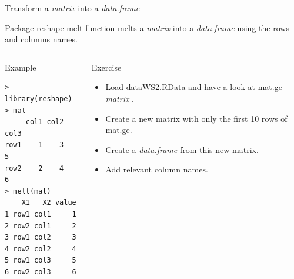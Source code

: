 \documentclass[10pt]{beamer}
\newcommand{\df}{{\it data.frame} }
\newcommand{\mat}{{\it matrix} }
\begin{document}
\begin{frame}[fragile]{Transform a \mat into a \df}
  \begin{block}{Package {\sf reshape}}
    {\sf melt} function melts a \mat into a \df using the rows and columns names.    
  \end{block}
  \begin{columns}
    \begin{column}{.5\textwidth}
      \begin{exampleblock}{Example}
\begin{verbatim}
> library(reshape)
> mat
     col1 col2 col3
row1    1    3    5
row2    2    4    6
> melt(mat)
    X1   X2 value
1 row1 col1     1
2 row2 col1     2
3 row1 col2     3
4 row2 col2     4
5 row1 col3     5
6 row2 col3     6
\end{verbatim}
      \end{exampleblock}
    \end{column}
    \begin{column}{.5\textwidth}
      \begin{alertblock}{Exercise}
        \begin{itemize}
        \item Load {\sf dataWS2.RData} and have a look at {\sf mat.ge} \mat.
        \item Create a new matrix with only the first 10 rows of {\sf mat.ge}.
        \item Create a \df from this new matrix.
        \item Add relevant column names.
        \end{itemize}
      \end{alertblock}
    \end{column}
  \end{columns}
\end{frame}
\end{document}
